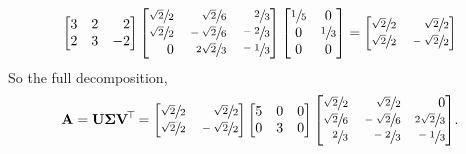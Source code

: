 \documentclass[11pt]{article}
\begin{document}
\begin{enumerate}
\[\begin{bmatrix*}[r]
                  3 & 2 & 2 \\
                  2 & 3 & -2 \\
              \end{bmatrix*}
              \begin{bmatrix*}[r]
                  \sfrac{\sqrt{2}}{2} & \sfrac{\sqrt{2}}{6}  & \sfrac{2}{3}  \\
                  \sfrac{\sqrt{2}}{2} & \sfrac{-\sqrt{2}}{6} & \sfrac{-2}{3} \\
                  0                   & \sfrac{2\sqrt{2}}{3} & \sfrac{-1}{3} \\
              \end{bmatrix*}
              \begin{bmatrix*}[c]
                  \sfrac{1}{5} & 0 \\
                  0 & \sfrac{1}{3} \\
                  0 & 0 \\
              \end{bmatrix*}
              =
              \begin{bmatrix*}[r]
                  \sfrac{\sqrt{2}}{2} & \sfrac{\sqrt{2}}{2} \\
                  \sfrac{\sqrt{2}}{2} & \sfrac{-\sqrt{2}}{2} \\
              \end{bmatrix*}
          \]
          So the full decomposition,
          \[
              \mat{A} = \mat{U} \mat{\Sigma} \mat{V}^{\T} =
              \begin{bmatrix*}[r]
                  \sfrac{\sqrt{2}}{2} & \sfrac{\sqrt{2}}{2} \\
                  \sfrac{\sqrt{2}}{2} & \sfrac{-\sqrt{2}}{2} \\
              \end{bmatrix*}
              \begin{bmatrix}
                  5 & 0 & 0 \\
                  0 & 3 & 0 \\
              \end{bmatrix}
              \begin{bmatrix*}[r]
                  \sfrac{\sqrt{2}}{2} & \sfrac{\sqrt{2}}{2}  & 0 \\
                  \sfrac{\sqrt{2}}{6} & \sfrac{-\sqrt{2}}{6} & \sfrac{2\sqrt{2}}{3} \\
                  \sfrac{2}{3}        & \sfrac{-2}{3}        & \sfrac{-1}{3} \\
              \end{bmatrix*}
              \! .
          \]


\end{enumerate}
\end{document}
